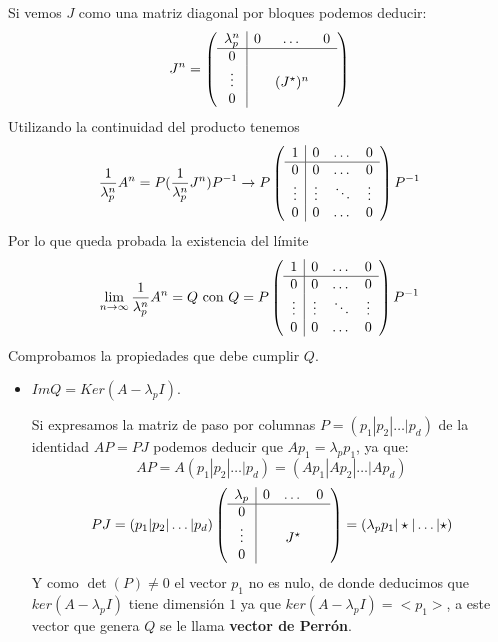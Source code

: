 \documentclass[size=a4, parskip=half, titlepage=false, toc=flat, toc=bib, 12pt]{scrartcl}
\makeatletter
\renewenvironment{proof}[1][\proofname] {\par\pushQED{\qed}\normalfont\topsep6\p@\@plus6\p@\relax\trivlist\item[\hskip\labelsep\itshape\tgpaella#1\@addpunct{.}]\ignorespaces}{\popQED\endtrivlist\@endpefalse}
\theoremstyle{theorem-style}
\theoremstyle{definition-style}
\theoremstyle{remark-style}
\theoremstyle{example-style}
\theoremstyle{definition-style}
\theoremstyle{remark-style}
\makeatother
\begin{document}
\begin{proof}
Si vemos $J$ como una matriz diagonal por bloques podemos deducir:
$$J^n =      \left(
      \begin{array}{{c|ccc}}
        \lambda_p^n     &    0      &   \dots    & 0\\\hline
            0         &           &        &  \\
            \vdots    &           & (J^{\star})^n &  \\
           0          &           &        &
      \end{array}
    \right)$$
Utilizando la continuidad del producto tenemos
$$\frac{1}{\lambda_p^n} A^n = P (\frac{1}{\lambda_p^n}  J^n)P^{-1} \rightarrow P \left(
      \begin{array}{{c|ccc}}
            1         &    0      &   \dots    & 0\\\hline
            0         &    0       &    \dots    & 0 \\
            \vdots    &    \vdots  &  \ddots &  \vdots \\
           0          &     0       &    \dots    & 0
      \end{array}   \right) P^{-1}$$
Por lo que queda probada la existencia del límite
$$\lim_{n \to \infty} \frac{1}{\lambda_p^n} A^n  = Q \  \textrm{con} \ Q = P \left(
      \begin{array}{{c|ccc}}
            1         &    0      &   \dots    & 0\\\hline
            0         &    0       &    \dots    & 0 \\
            \vdots    &    \vdots  &  \ddots &  \vdots \\
           0          &     0       &    \dots    & 0
      \end{array}   \right) P^{-1} $$
Comprobamos la propiedades que debe cumplir $Q$.
\begin{itemize}
\item $Im Q = Ker (A - \lambda_p I)$.

Si expresamos la matriz de paso por columnas $P = (p_1 | p_2 | \dots | p_d)$ de la identidad $AP = PJ$ podemos deducir que $Ap_1 = \lambda_p p_1$, ya que:
$$AP = A (p_1 | p_2 | \dots | p_d) = (A p_1 |A p_2 | \dots |A p_d)$$
$$PJ =  (p_1 | p_2 | \dots | p_d) \left(
  \begin{array}{{c|ccc}}
    \lambda_p     &    0      &   \dots    & 0\\\hline
        0         &           &        &  \\
        \vdots    &           & J^{\star} &  \\
       0          &           &        &
  \end{array}
\right)  = ( \lambda_p p_1 | \star | \dots | \star) $$
Y como $\det(P) \neq 0$ el vector $p_1$ no es nulo, de donde deducimos que $ker(A - \lambda_p I)$ tiene dimensión $1$ ya que $ker(A - \lambda_p I) = <p_1>$, a este vector que genera $Q$ se le llama \textbf{vector de Perrón}.


\end{itemize}
\end{proof}
\end{document}
